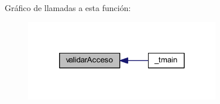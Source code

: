Gráfico de llamadas a esta función\-:
\nopagebreak
\begin{figure}[H]
\begin{center}
\leavevmode
\includegraphics[width=240pt]{_encriptador_8cpp_a514eeb9d37c47513308d43f3ddcb5d66_icgraph}
\end{center}
\end{figure}


